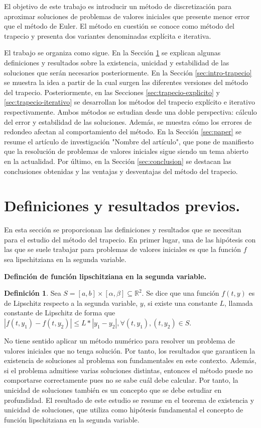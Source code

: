 \documentclass{article}
\theoremstyle{theorem-style}  %
\theoremstyle{definition}
\newtheorem{definition}{Definición}[section]
\theoremstyle{example-style}
\begin{document}
	El objetivo de este trabajo es introducir un método de discretización para aproximar soluciones de problemas de valores iniciales que presente menor error que el método de Euler. El método en cuestión se conoce como método del trapecio y presenta dos variantes denominadas explícita e iterativa. 
	
	El trabajo se organiza como sigue. En la Sección \ref{sec:previo} se explican algunas definiciones y resultados sobre la existencia, unicidad y estabilidad de las soluciones que serán necesarios posteriormente. En la Sección \ref{sec:intro-trapecio} se muestra la idea a partir de la cual surgen las diferentes versiones del método del trapecio. Posteriormente, en las Secciones \ref{sec:trapecio-explicito} y \ref{sec:trapecio-iterativo} se desarrollan los métodos del trapecio explícito e iterativo respectivamente. Ambos métodos se estudian desde una doble perspectiva: cálculo del error y estabilidad de las soluciones. Además, se muestra cómo los errores de redondeo afectan al comportamiento del método. En la Sección \ref{sec:paper} se resume el artículo de investigación "Nombre del artículo", que pone de manifiesto que la resolución de problemas de valores iniciales sigue siendo un tema abierto en la actualidad. Por último, en la Sección \ref{sec:conclusion} se destacan las conclusiones obtenidas y las ventajas y desventajas del método del trapecio.
	
\section{Definiciones y resultados previos.} \label{sec:previo}
	
	En esta sección se proporcionan las definiciones y resultados que se necesitan para el estudio del método del trapecio. En primer lugar, una de las hipótesis con las que se suele trabajar para problemas de valores iniciales es que la función $f$ sea lipschitziana en la segunda variable.
	
	\textbf{Definción de función lipschitziana en la segunda variable.}
	\begin{definition}
		Sea $S = [a,b] \times [\alpha, \beta] \subseteq \mathbb R^2.$ Se dice que una función $f(t,y)$ es de Lipschitz respecto a la segunda variable, $y$, si existe una constante $L$, llamada constante de Lipschitz de forma que $|f(t,y_1) - f(t, y_2)| \le L * |y_1 - y_2|,  \forall (t,y_1), (t,y_2) \in S $.  
	\end{definition}
	
	No tiene sentido aplicar un método numérico para resolver un problema de valores iniciales que no tenga solución. Por tanto, los resultados que garanticen la existencia de soluciones al problema son fundamentales en este contexto. Además, si el problema admitiese varias soluciones distintas, entonces el método puede no comportarse correctamente pues no se sabe cuál debe calcular. Por tanto, la unicidad de soluciones también es un concepto que se debe estudiar en profundidad. El resultado de este estudio se resume en el teorema de existencia y unicidad de soluciones, que utiliza como hipótesis fundamental el concepto de función lipschitziana en la segunda variable.
	
\end{document}

